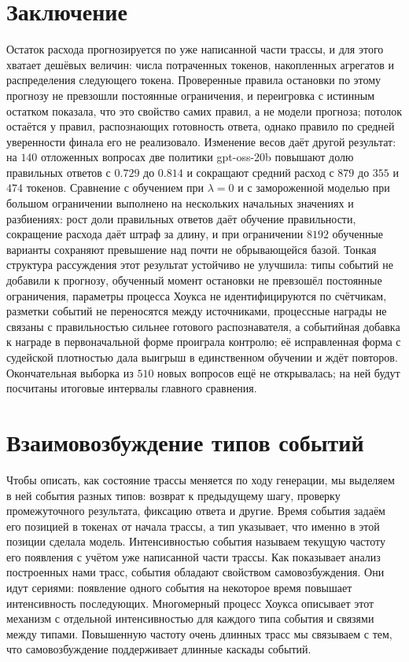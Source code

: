 \documentclass[11pt]{article}
\begin{document}
\section{Заключение}

Остаток расхода прогнозируется по уже написанной части трассы, и для этого хватает дешёвых величин: числа потраченных токенов, накопленных агрегатов и распределения следующего токена. Проверенные правила остановки по этому прогнозу не превзошли постоянные ограничения, и переигровка с истинным остатком показала, что это свойство самих правил, а не модели прогноза; потолок остаётся у правил, распознающих готовность ответа, однако правило по средней уверенности финала его не реализовало. Изменение весов даёт другой результат: на $140$ отложенных вопросах две политики gpt-oss-20b повышают долю правильных ответов с $0.729$ до $0.814$ и сокращают средний расход с $879$ до $355$ и $474$ токенов. Сравнение с обучением при $\lambda=0$ и с замороженной моделью при большом ограничении выполнено на нескольких начальных значениях и разбиениях: рост доли правильных ответов даёт обучение правильности, сокращение расхода даёт штраф за длину, и при ограничении $8192$ обученные варианты сохраняют превышение над почти не обрывающейся базой. Тонкая структура рассуждения этот результат устойчиво не улучшила: типы событий не добавили к прогнозу, обученный момент остановки не превзошёл постоянные ограничения, параметры процесса Хоукса не идентифицируются по счётчикам, разметки событий не переносятся между источниками, процессные награды не связаны с правильностью сильнее готового распознавателя, а событийная добавка к награде в первоначальной форме проиграла контролю; её исправленная форма с судейской плотностью дала выигрыш в единственном обучении и ждёт повторов. Окончательная выборка из $510$ новых вопросов ещё не открывалась; на ней будут посчитаны итоговые интервалы главного сравнения.

\appendix

\section{Взаимовозбуждение типов событий}
\label{app:hawkes}

Чтобы описать, как состояние трассы меняется по ходу генерации, мы выделяем в ней события разных типов: возврат к предыдущему шагу, проверку промежуточного результата, фиксацию ответа и другие. Время события задаём его позицией в токенах от начала трассы, а тип указывает, что именно в этой позиции сделала модель. Интенсивностью события называем текущую частоту его появления с учётом уже написанной части трассы. Как показывает анализ построенных нами трасс, события обладают свойством самовозбуждения. Они идут сериями: появление одного события на некоторое время повышает интенсивность последующих. Многомерный процесс Хоукса \citep{hawkes1971,hawkes1974cluster} описывает этот механизм с отдельной интенсивностью для каждого типа события и связями между типами. Повышенную частоту очень длинных трасс мы связываем с тем, что самовозбуждение поддерживает длинные каскады событий.
\end{document}
